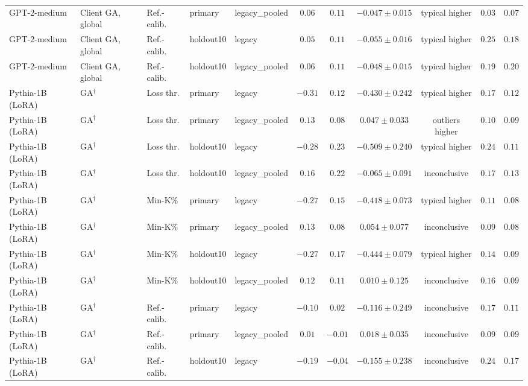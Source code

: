 \begin{table}[t]
\begin{tabular*}{\textwidth}{@{\extracolsep{\fill}}lllllcccccc@{}}
GPT-2-medium & Client GA, global & Ref.-calib. & primary & legacy\_pooled & $0.06$ & $0.11$ & $-0.047 \pm 0.015$ & typical higher & $0.03$ & $0.07$ \\
GPT-2-medium & Client GA, global & Ref.-calib. & holdout10 & legacy & $0.05$ & $0.11$ & $-0.055 \pm 0.016$ & typical higher & $0.25$ & $0.18$ \\
GPT-2-medium & Client GA, global & Ref.-calib. & holdout10 & legacy\_pooled & $0.06$ & $0.11$ & $-0.048 \pm 0.015$ & typical higher & $0.19$ & $0.20$ \\
Pythia-1B (LoRA) & GA$^{\dagger}$ & Loss thr. & primary & legacy & $-0.31$ & $0.12$ & $-0.430 \pm 0.242$ & typical higher & $0.17$ & $0.12$ \\
Pythia-1B (LoRA) & GA$^{\dagger}$ & Loss thr. & primary & legacy\_pooled & $0.13$ & $0.08$ & $0.047 \pm 0.033$ & outliers higher & $0.10$ & $0.09$ \\
Pythia-1B (LoRA) & GA$^{\dagger}$ & Loss thr. & holdout10 & legacy & $-0.28$ & $0.23$ & $-0.509 \pm 0.240$ & typical higher & $0.24$ & $0.11$ \\
Pythia-1B (LoRA) & GA$^{\dagger}$ & Loss thr. & holdout10 & legacy\_pooled & $0.16$ & $0.22$ & $-0.065 \pm 0.091$ & inconclusive & $0.17$ & $0.13$ \\
Pythia-1B (LoRA) & GA$^{\dagger}$ & Min-K\% & primary & legacy & $-0.27$ & $0.15$ & $-0.418 \pm 0.073$ & typical higher & $0.11$ & $0.08$ \\
Pythia-1B (LoRA) & GA$^{\dagger}$ & Min-K\% & primary & legacy\_pooled & $0.13$ & $0.08$ & $0.054 \pm 0.077$ & inconclusive & $0.09$ & $0.08$ \\
Pythia-1B (LoRA) & GA$^{\dagger}$ & Min-K\% & holdout10 & legacy & $-0.27$ & $0.17$ & $-0.444 \pm 0.079$ & typical higher & $0.14$ & $0.09$ \\
Pythia-1B (LoRA) & GA$^{\dagger}$ & Min-K\% & holdout10 & legacy\_pooled & $0.12$ & $0.11$ & $0.010 \pm 0.125$ & inconclusive & $0.16$ & $0.09$ \\
Pythia-1B (LoRA) & GA$^{\dagger}$ & Ref.-calib. & primary & legacy & $-0.10$ & $0.02$ & $-0.116 \pm 0.249$ & inconclusive & $0.17$ & $0.11$ \\
Pythia-1B (LoRA) & GA$^{\dagger}$ & Ref.-calib. & primary & legacy\_pooled & $0.01$ & $-0.01$ & $0.018 \pm 0.035$ & inconclusive & $0.09$ & $0.09$ \\
Pythia-1B (LoRA) & GA$^{\dagger}$ & Ref.-calib. & holdout10 & legacy & $-0.19$ & $-0.04$ & $-0.155 \pm 0.238$ & inconclusive & $0.24$ & $0.17$ \\

\end{tabular*}
\end{table}
